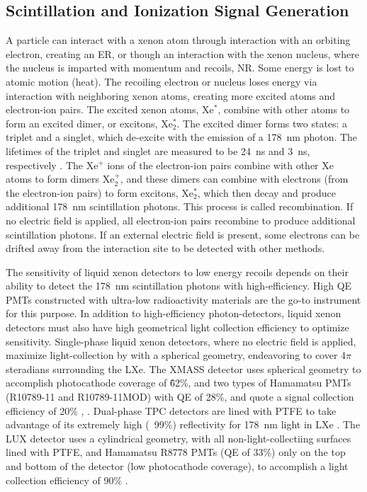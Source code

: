 \subsection{Scintillation and Ionization Signal Generation}
\label{sec:signal_generation}
A particle can interact with a xenon atom through interaction with an orbiting electron, creating an \ac{ER}, or though an interaction with the xenon nucleus, where the nucleus is imparted with momentum and recoils, \ac{NR}. Some energy is lost to atomic motion (heat). The recoiling electron or nucleus loses energy via interaction with neighboring xenon atoms, creating more excited atoms and electron-ion pairs. The excited xenon atoms, Xe$^{*}$, combine with other atoms to form an excited dimer, or excitons, Xe$_{2}^{*}$. The excited dimer forms two states: a triplet and a singlet, which de-excite with the emission of a 178~nm photon. The lifetimes of the triplet and singlet are measured to be 24~ns and 3~ns, respectively \cite{Mock2014}. The Xe$^{+}$ ions of the electron-ion pairs combine with other Xe atoms to form dimers Xe$_{2}^{+}$, and these dimers can combine with electrons (from the electron-ion pairs) to form excitons, Xe$_{2}^{*}$, which then decay and produce additional 178~nm scintillation photons. This process is called recombination. If no electric field is applied, all electron-ion pairs recombine to produce additional scintillation photons. If an external electric field is present, some electrons can be drifted away from the interaction site to be detected with other methods. 

The sensitivity of liquid xenon detectors to low energy recoils depends on their ability to detect the 178~nm scintillation photons with high-efficiency. High \ac{QE} \ac{PMT}s constructed with ultra-low radioactivity materials are the go-to instrument for this purpose. In addition to high-efficiency photon-detectors, liquid xenon detectors must also have high geometrical light collection efficiency to optimize sensitivity. Single-phase liquid xenon detectors, where no electric field is applied, maximize light-collection by with a spherical geometry, endeavoring to cover 4$\pi$ steradians surrounding the \ac{LXe}. The XMASS detector uses spherical geometry to accomplish photocathode coverage of \~62\%, and two types of Hamamatsu \ac{PMT}s (R10789-11 and R10789-11MOD) with \ac{QE} of 28\%, and quote a signal collection efficiency of 20\% \cite{Abe2013}, \cite{XMASSCollaboration2018}. Dual-phase \ac{TPC} detectors are lined with \ac{PTFE} to take advantage of its extremely high (~99\%) reflectivity for 178~nm light in \ac{LXe} \cite{Neves2017}. The LUX detector uses a cylindrical geometry, with all non-light-collectiing surfaces lined with \ac{PTFE}, and Hamamatsu R8778 \ac{PMT}s (\ac{QE} of 33\%) only on the top and bottom of the detector (low photocathode coverage), to accomplish a light collection efficiency of 90\% \cite{Faham2014}.

